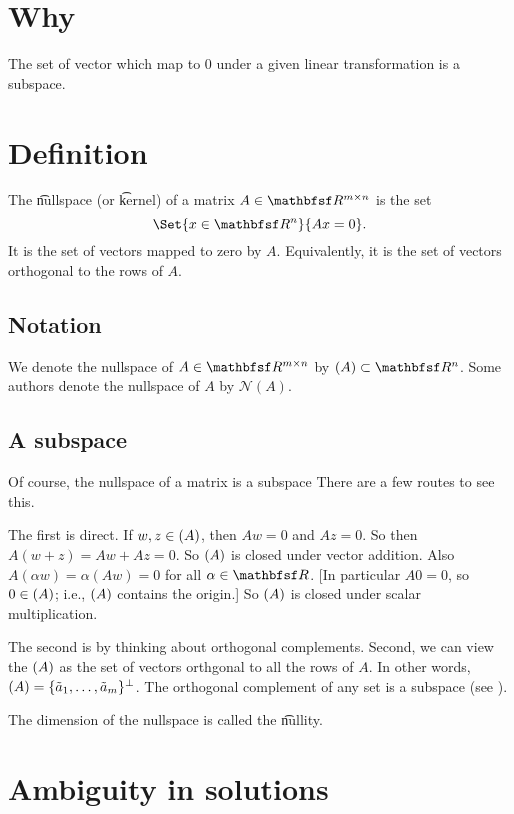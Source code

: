 
\section*{Why}

The set of vector which map to 0 under a given linear transformation is a subspace.

\section*{Definition}

The \t{nullspace} (or \t{kernel}) of a matrix $A \in \R ^{m \times  n}$ is the set
\[
\Set{x \in \R ^n}{Ax = 0}.
\]
It is the set of vectors mapped to zero by $A$.
Equivalently, it is the set of vectors orthogonal to the rows of $A$.

\subsection*{Notation}

We denote the nullspace of $A \in \R ^{m \times  n}$ by $\null(A) \subset \R ^{n}$.
Some authors denote the nullspace of $A$ by $\mathcal{N} (A)$.

\subsection*{A subspace}

Of course, the nullspace of a matrix is a subspace
There are a few routes to see this.

The first is direct.
If $w, z \in \null(A)$, then $Aw = 0$ and $Az = 0$.
So then $A(w + z) = Aw + Az = 0$.
So $\null(A)$ is closed under vector addition.
Also $A(\alpha w) = \alpha (Aw) = 0$ for all $\alpha  \in \R $.
[In particular $A0 = 0$, so $0 \in \null(A)$; i.e., $\null(A)$ contains the origin.]
So $\null(A)$ is closed under scalar multiplication.

The second is by thinking about orthogonal complements.
Second, we can view the $\null(A)$ as the set of vectors orthgonal to all the rows of $A$.
In other words, $\null(A) = \set{\tilde{a}_1, \dots , \tilde{a}_m}^\perp $.
The orthogonal complement of any set is a subspace (see ).

The dimension of the nullspace is called the \t{nullity}.

\section*{Ambiguity in solutions}

